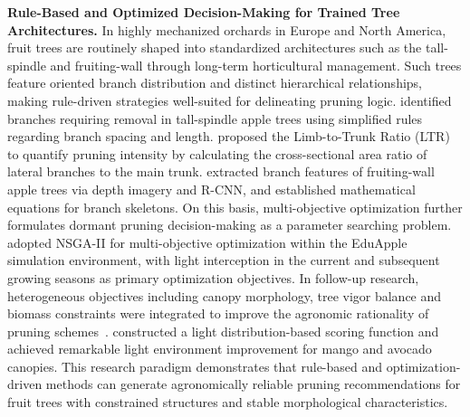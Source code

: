 \documentclass[12pt,a4paper,fontset=fandol]{ctexart}
\begin{document}
\textbf{Rule-Based and Optimized Decision-Making for Trained Tree Architectures.}
In highly mechanized orchards in Europe and North America, fruit trees are routinely shaped into standardized architectures such as the tall-spindle and fruiting-wall through long-term horticultural management.
Such trees feature oriented branch distribution and distinct hierarchical relationships, making rule-driven strategies well-suited for delineating pruning logic.
\citet{karkee2014identification} identified branches requiring removal in tall-spindle apple trees using simplified rules regarding branch spacing and length.
\citet{robinson2017quantifying} proposed the Limb-to-Trunk Ratio (LTR) to quantify pruning intensity by calculating the cross-sectional area ratio of lateral branches to the main trunk.
\citet{he2022branch} extracted branch features of fruiting-wall apple trees via depth imagery and R-CNN, and established mathematical equations for branch skeletons.
On this basis, multi-objective optimization further formulates dormant pruning decision-making as a parameter searching problem.
\citet{strnad2020framework} adopted NSGA-II for multi-objective optimization within the EduApple simulation environment, with light interception in the current and subsequent growing seasons as primary optimization objectives.
In follow-up research, heterogeneous objectives including canopy morphology, tree vigor balance and biomass constraints were integrated to improve the agronomic rationality of pruning schemes~\citep{strnad2021constrained}.
\citet{westling2021procedure} constructed a light distribution-based scoring function and achieved remarkable light environment improvement for mango and avocado canopies.
This research paradigm demonstrates that rule-based and optimization-driven methods can generate agronomically reliable pruning recommendations for fruit trees with constrained structures and stable morphological characteristics.
\end{document}
